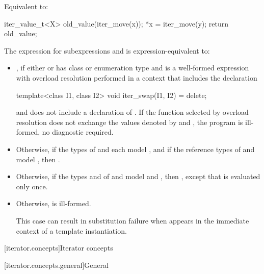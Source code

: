 \begin{itemdescr}
\pnum
\effects
Equivalent to:
\begin{codeblock}
iter_value_t<X> old_value(iter_move(x));
*x = iter_move(y);
return old_value;
\end{codeblock}
\end{itemdescr}

\pnum
The expression  for subexpressions
 and  is expression-equivalent to:
\begin{itemize}
\item {}, if either
 or  has class or enumeration type and
 is a well-formed expression
with overload resolution performed in a context that includes the declaration
\begin{codeblock}
template<class I1, class I2>
  void iter_swap(I1, I2) = delete;
\end{codeblock}
and does not include a declaration of .
If the function selected by overload resolution does not exchange the values
denoted by  and ,
the program is ill-formed, no diagnostic required.

\item Otherwise, if the types of  and  each model
, and if the reference types of  and 
model ,
then .

\item Otherwise, if the types  and  of  and
 model  and
, then
,
except that  is evaluated only once.

\item Otherwise,  is ill-formed.
\begin{note}
This case can result in substitution failure when 
appears in the immediate context of a template instantiation.
\end{note}
\end{itemize}

[iterator.concepts]{Iterator concepts}

[iterator.concepts.general]{General}

